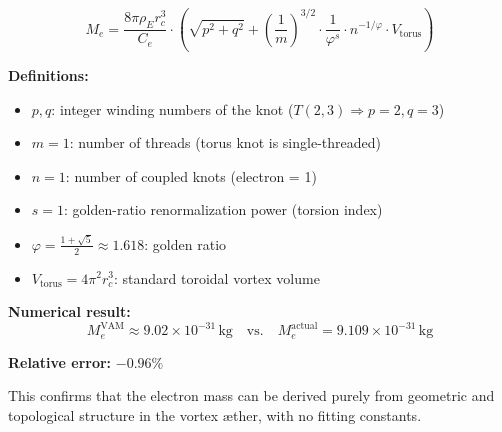 \[
\boxed{
M_e = \frac{8\pi \rho_{\scriptscriptstyle\boldsymbol\!E}r_c^3}{C_e} \cdot \left( \sqrt{p^2 + q^2} + \left( \frac{1}{m} \right)^{3/2} \cdot \frac{1}{\varphi^s} \cdot n^{-1/\varphi} \cdot V_{\text{torus}} \right)
}
\]

\textbf{Definitions:}
\begin{itemize}
  \item \( p, q \): integer winding numbers of the knot (\( T(2,3) \Rightarrow p = 2, q = 3 \))
  \item \( m = 1 \): number of threads (torus knot is single-threaded)
  \item \( n = 1 \): number of coupled knots (electron = 1)
  \item \( s = 1 \): golden-ratio renormalization power (torsion index)
  \item \( \varphi = \frac{1+\sqrt{5}}{2} \approx 1.618 \): golden ratio
  \item \( V_{\text{torus}} = 4\pi^2 r_c^3 \): standard toroidal vortex volume
\end{itemize}

\textbf{Numerical result:}
\[
M_e^{\text{VAM}} \approx 9.02 \times 10^{-31} \, \text{kg}
\quad \text{vs.} \quad
M_e^{\text{actual}} = 9.109 \times 10^{-31} \, \text{kg}
\]

\textbf{Relative error:} \( -0.96\% \)

This confirms that the electron mass can be derived purely from geometric and topological structure in the vortex æther, with no fitting constants.